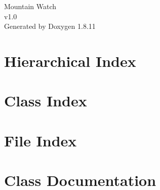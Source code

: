 \documentclass[twoside]{book}
\newcommand{\+}{\discretionary{\mbox{\scriptsize$\hookleftarrow$}}{}{}}
\newcommand{\clearemptydoublepage}{%
  \newpage{\pagestyle{empty}\cleardoublepage}%
}
\begin{document}
\hypersetup{pageanchor=false,
             bookmarksnumbered=true,
             pdfencoding=unicode
            }
\begin{titlepage}
\vspace*{7cm}
\begin{center}%
{\Large Mountain Watch \\[1ex]\large v1.\+0 }\\
\vspace*{1cm}
{\large Generated by Doxygen 1.8.11}\\
\end{center}
\end{titlepage}
\clearemptydoublepage
\tableofcontents
\clearemptydoublepage
{}
\hypersetup{pageanchor=true}

\chapter{Hierarchical Index}

\chapter{Class Index}

\chapter{File Index}

\chapter{Class Documentation}




































\end{document}
